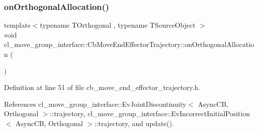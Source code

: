 \subsubsection{\texorpdfstring{on\+Orthogonal\+Allocation()}{onOrthogonalAllocation()}}
{\footnotesize\ttfamily template$<$typename T\+Orthogonal , typename T\+Source\+Object $>$ \\
void cl\+\_\+move\+\_\+group\+\_\+interface\+::\+Cb\+Move\+End\+Effector\+Trajectory\+::on\+Orthogonal\+Allocation (\begin{DoxyParamCaption}{ }\end{DoxyParamCaption})\hspace{0.3cm}{\ttfamily [inline]}}



Definition at line 51 of file cb\+\_\+move\+\_\+end\+\_\+effector\+\_\+trajectory.\+h.



References cl\+\_\+move\+\_\+group\+\_\+interface\+::\+Ev\+Joint\+Discontinuity$<$ Async\+C\+B, Orthogonal $>$\+::trajectory, cl\+\_\+move\+\_\+group\+\_\+interface\+::\+Ev\+Incorrect\+Initial\+Position$<$ Async\+C\+B, Orthogonal $>$\+::trajectory, and update().


